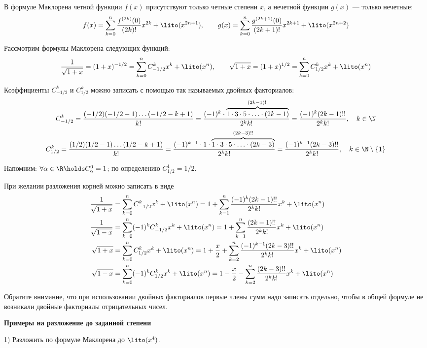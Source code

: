 \Note В формуле Маклорена четной функции $f(x)$ присутствуют только четные степени $x$, а нечетной функции $g(x)$ --- только нечетные:
$$f(x) = \sum_{k=0}^{n} \frac{f^{(2k)}(0)}{(2k)!}x^{2k} + \lito(x^{2n+1}), \qquad g(x) = \sum_{k=0}^{n} \frac{g^{(2k+1)}(0)}{(2k+1)!}x^{2k+1} + \lito(x^{2n+2})$$

\Note Рассмотрим формулы Маклорена следующих функций:
$$\frac{1}{\sqrt{1+x}} = (1+x)^{-1/2} = \sum_{k=0}^{n} C_{-1/2}^k x^k + \lito(x^n), \qquad
\sqrt{1+x} = (1+x)^{1/2} = \sum_{k=0}^{n} C_{1/2}^k x^k + \lito(x^n)$$

Коэффициенты $C_{-1/2}^k$ и $C_{1/2}^k$ можно записать с помощью так называемых двойных факториалов:
$$C_{-1/2}^k = \frac{(-1/2)(-1/2-1) \ldots (-1/2-k+1)}{k!} = \frac{(-1)^k\cdot \overbrace{1 \cdot 3 \cdot 5 \cdot \ldots \cdot (2k-1)}^{(2k-1)!!}}{2^k k!} = \frac{(-1)^k (2k-1)!!}{2^k k!}, \quad k \in \N$$
$$C_{1/2}^k = \frac{(1/2)(1/2-1) \ldots (1/2-k+1)}{k!} = \frac{(-1)^{k-1}\cdot 1 \cdot \overbrace{1 \cdot 3 \cdot 5 \cdot \ldots \cdot (2k-3)}^{(2k-3)!!}}{2^k k!} = \frac{(-1)^{k-1} (2k-3)!!}{2^k k!}, \quad k \in \N \setminus \{1\} $$

Напомним: $\forall \alpha \in \R \holds C_\alpha^0 = 1$; по определению $C_{1/2}^{1} = 1/2$.

При желании разложения корней можно записать в виде
\begin{align*}
\frac{1}{\sqrt{1+x}} & = \sum_{k=0}^{n} C_{-1/2}^k x^k + \lito(x^n) = 1 + \sum_{k=1}^{n} \frac{(-1)^k (2k-1)!!}{2^k k!} x^k + \lito(x^n) \\
\frac{1}{\sqrt{1-x}} & = \sum_{k=0}^{n} (-1)^k C_{-1/2}^k x^k + \lito(x^n) = 1 + \sum_{k=1}^{n} \frac{(2k-1)!!}{2^k k!} x^k + \lito(x^n) \\
\sqrt{1+x}           & = \sum_{k=0}^{n} C_{1/2}^k x^k + \lito(x^n) = 1 + \frac{x}{2} + \sum_{k=2}^{n} \frac{(-1)^{k-1} (2k-3)!!}{2^k k!} x^k + \lito(x^n) \\
\sqrt{1-x}           & = \sum_{k=0}^{n} (-1)^k C_{1/2}^k x^k + \lito(x^n) = 1 - \frac{x}{2} - \sum_{k=2}^{n} \frac{(2k-3)!!}{2^k k!} x^k + \lito(x^n)
\end{align*}

Обратите внимание, что при использовании двойных факториалов первые члены сумм надо записать отдельно, чтобы в общей формуле не возникали двойные факториалы отрицательных чисел.

\newpage

\textbf{Примеры на разложение до заданной степени}

1) Разложить по формуле Маклорена до $\lito(x^4)$.

